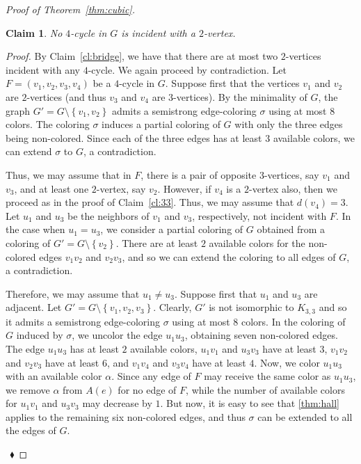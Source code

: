 \documentclass[12pt,a4paper]{article}
\newtheorem{claim}{Claim}
\newcommand{\set}[1]{\ensuremath{\left\{#1 \right\}}}
\newenvironment{proofclaim}[1][]%
    {\noindent \emph{Proof.} {}{#1}{}}{$~$\hfill $~\blacklozenge$ \vspace{0.2cm}}
\begin{document}
\begin{proof}[Proof of Theorem~\ref{thm:cubic}]
	\begin{claim}
		\label{cl:4no2v}
		No $4$-cycle in $G$ is incident with a $2$-vertex.
	\end{claim}
	
	\begin{proofclaim}
		By Claim~\ref{cl:bridge}, we have that there are at most two $2$-vertices incident with any $4$-cycle.
		We again proceed by contradiction.
		Let $F = (v_1,v_2,v_3,v_4)$ be a $4$-cycle in $G$.
		Suppose first that the vertices $v_1$ and $v_2$ are $2$-vertices (and thus $v_3$ and $v_4$ are $3$-vertices).
		By the minimality of $G$, the graph $G' = G \setminus \set{v_1,v_2}$ admits a semistrong edge-coloring $\sigma$ using at most $8$ colors.
		The coloring $\sigma$ induces a partial coloring of $G$ with only the three edges being non-colored.
		Since each of the three edges has at least $3$ available colors, we can extend $\sigma$ to $G$, a contradiction.
		
		Thus, we may assume that in $F$, there is a pair of opposite $3$-vertices, say $v_1$ and $v_3$,
		and at least one $2$-vertex, say $v_2$. 
		However, if $v_4$ is a $2$-vertex also, then we proceed as in the proof of Claim~\ref{cl:33}.
		Thus, we may assume that $d(v_4) = 3$.
		Let $u_1$ and $u_3$ be the neighbors of $v_1$ and $v_3$, respectively, not incident with $F$.
		In the case when $u_1 = u_3$, we consider a partial coloring of $G$ obtained from a coloring of $G' = G \setminus \set{v_2}$.
		There are at least $2$ available colors for the non-colored edges $v_1v_2$ and $v_2v_3$, and so we can extend the coloring to all edges of $G$, a contradiction.
		
		Therefore, we may assume that $u_1 \neq u_3$. %
		Suppose first that $u_1$ and $u_3$ are adjacent.
		Let $G' = G \setminus \set{v_1,v_2,v_3}$. %
		Clearly, $G'$ is not isomorphic to $K_{3,3}$ and so it admits a semistrong edge-coloring $\sigma$ using at most $8$ colors.
		In the coloring of $G$ induced by $\sigma$, we uncolor the edge $u_1u_3$, obtaining seven non-colored edges.
		The edge $u_1u_3$ has at least $2$ available colors,
		$u_1v_1$ and $u_3v_3$ have at least $3$,
		$v_1v_2$ and $v_2v_3$ have at least $6$,
		and $v_1v_4$ and $v_3v_4$ have at least $4$.
		Now, we color $u_1u_3$ with an available color $\alpha$. 
		Since any edge of $F$ may receive the same color as $u_1u_3$, we remove $\alpha$ from $A(e)$ for no edge of $F$, 
		while the number of available colors for $u_1v_1$ and $u_3v_3$ may decrease by $1$.
		But now, it is easy to see that \cref{thm:hall} applies to the remaining six non-colored edges, and thus $\sigma$ can be extended to all the edges of $G$.
	

\end{proofclaim}
\end{proof}
\end{document}
